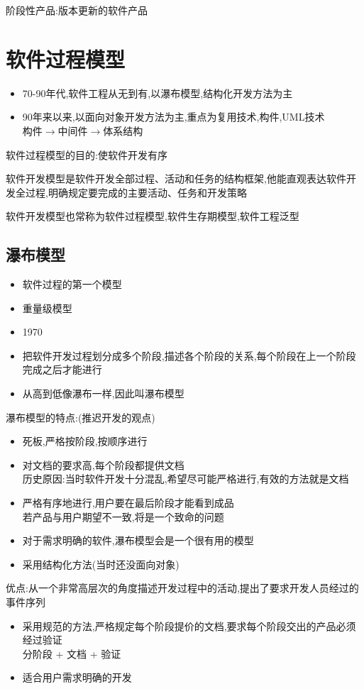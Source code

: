 \documentclass[UTF8,a4paper]{ctexart}
\begin{document}
阶段性产品:版本更新的软件产品

\section{软件过程模型}
\begin{itemize}
  \item 70-90年代,软件工程从无到有,以瀑布模型,结构化开发方法为主
  \item 90年来以来,以面向对象开发方法为主,重点为复用技术,构件,UML技术\\
  构件$\to$中间件$\to$体系结构
\end{itemize}

软件过程模型的目的:使软件开发有序

软件开发模型是软件开发全部过程、活动和任务的结构框架,他能直观表达软件开发全过程,明确规定要完成的主要活动、任务和开发策略

软件开发模型也常称为软件过程模型,软件生存期模型,软件工程泛型

\subsection{瀑布模型}
\begin{itemize}
  \item 软件过程的第一个模型
  \item 重量级模型
  \item 1970
  \item 把软件开发过程划分成多个阶段,描述各个阶段的关系,每个阶段在上一个阶段完成之后才能进行
  \item 从高到低像瀑布一样,因此叫瀑布模型
\end{itemize}

瀑布模型的特点:(推迟开发的观点)
\begin{itemize}
  \item 死板,严格按阶段,按顺序进行
  \item 对文档的要求高,每个阶段都提供文档\\
  历史原因:当时软件开发十分混乱,希望尽可能严格进行,有效的方法就是文档
  \item 严格有序地进行,用户要在最后阶段才能看到成品\\
  若产品与用户期望不一致,将是一个致命的问题
  \item 对于需求明确的软件,瀑布模型会是一个很有用的模型
  \item 采用结构化方法(当时还没面向对象)
\end{itemize}

优点:从一个非常高层次的角度描述开发过程中的活动,提出了要求开发人员经过的事件序列
\begin{itemize}
  \item 采用规范的方法,严格规定每个阶段提价的文档,要求每个阶段交出的产品必须经过验证\\
  分阶段 + 文档 + 验证
  \item 适合用户需求明确的开发
\end{itemize}
\end{document}
